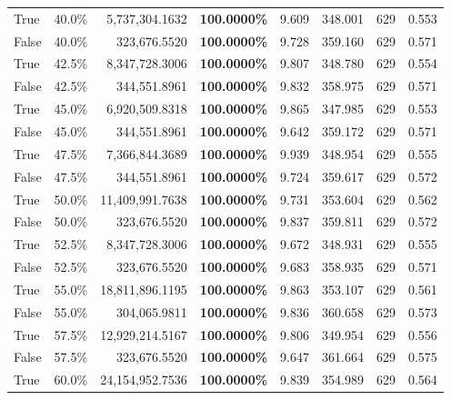 \begin{table}[H]
\begin{tabular}{|m{}| m{}| r | R{0.13\textwidth}| R{0.09\textwidth}| R{0.09\textwidth}| R{0.09\textwidth}| R{0.11\textwidth}}
True & 40.0\% & 5,737,304.1632 & \bfseries \color{red} 100.0000\% & 9.609 & 348.001 & 629 & 0.553 \\
False & 40.0\% & 323,676.5520 & \bfseries \color{red} 100.0000\% & 9.728 & 359.160 & 629 & 0.571 \\
True & 42.5\% & 8,347,728.3006 & \bfseries \color{red} 100.0000\% & 9.807 & 348.780 & 629 & 0.554 \\
False & 42.5\% & 344,551.8961 & \bfseries \color{red} 100.0000\% & 9.832 & 358.975 & 629 & 0.571 \\
True & 45.0\% & 6,920,509.8318 & \bfseries \color{red} 100.0000\% & 9.865 & 347.985 & 629 & 0.553 \\
False & 45.0\% & 344,551.8961 & \bfseries \color{red} 100.0000\% & 9.642 & 359.172 & 629 & 0.571 \\
True & 47.5\% & 7,366,844.3689 & \bfseries \color{red} 100.0000\% & 9.939 & 348.954 & 629 & 0.555 \\
False & 47.5\% & 344,551.8961 & \bfseries \color{red} 100.0000\% & 9.724 & 359.617 & 629 & 0.572 \\
True & 50.0\% & 11,409,991.7638 & \bfseries \color{red} 100.0000\% & 9.731 & 353.604 & 629 & 0.562 \\
False & 50.0\% & 323,676.5520 & \bfseries \color{red} 100.0000\% & 9.837 & 359.811 & 629 & 0.572 \\
True & 52.5\% & 8,347,728.3006 & \bfseries \color{red} 100.0000\% & 9.672 & 348.931 & 629 & 0.555 \\
False & 52.5\% & 323,676.5520 & \bfseries \color{red} 100.0000\% & 9.683 & 358.935 & 629 & 0.571 \\
True & 55.0\% & 18,811,896.1195 & \bfseries \color{red} 100.0000\% & 9.863 & 353.107 & 629 & 0.561 \\
False & 55.0\% & \color{red} 304,065.9811 & \bfseries \color{red} 100.0000\% & 9.836 & 360.658 & 629 & 0.573 \\
True & 57.5\% & 12,929,214.5167 & \bfseries \color{red} 100.0000\% & 9.806 & 349.954 & 629 & 0.556 \\
False & 57.5\% & 323,676.5520 & \bfseries \color{red} 100.0000\% & 9.647 & 361.664 & 629 & 0.575 \\
True & 60.0\% & 24,154,952.7536 & \bfseries \color{red} 100.0000\% & 9.839 & 354.989 & 629 & 0.564 \\

\end{tabular}
\end{table}
